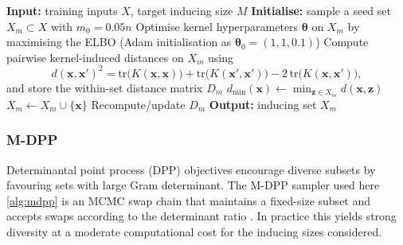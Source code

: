 \documentclass[11pt,a4paper]{article}
\providecommand{\Description}[1]{}
\newcommand{\bx}{\boldsymbol{x}}
\newcommand{\bz}{\boldsymbol{z}}
\newcommand{\btheta}{\boldsymbol{\theta}}
\begin{document}
\begin{algorithm}
\caption{Greedy inducing point selection}
\label{alg:greedy}
\begin{algorithmic}[1]
\State \textbf{Input:} training inputs $X$, target inducing size $M$
\State \textbf{Initialise:} sample a seed set $X_m \subset X$ with $m_0 = 0.05n$
\State Optimise kernel hyperparameters $\btheta$ on $X_m$ by maximising the ELBO (Adam initialisation as $\btheta_0=(1,1,0.1)$)
\State Compute pairwise kernel-induced distances on $X_m$ using
\begin{displaymath}d(\bx,\bx')^2 = \mathrm{tr}\bigl(K(\bx,\bx)\bigr) + \mathrm{tr}\bigl(K(\bx',\bx')\bigr) - 2\,\mathrm{tr}\bigl(K(\bx,\bx')\bigr),\end{displaymath}
and store the within-set distance matrix $D_m$
    \For{$\bx \in X \setminus X_m$}
        \State $d_{\min}(\bx) \gets \min_{\bz\in X_m} d(\bx,\bz)$
        \If{$d_{\min}(\bx) > q_{0.9}(D_m)$}
            \State $X_m \gets X_m \cup \{\bx\}$
            \State Recompute/update $D_m$
        \EndIf
    \EndFor
\EndWhile
\State \textbf{Output:} inducing set $X_m$
\end{algorithmic}
\Description{Pseudocode for greedy inducing-point selection. Starting from a random seed set, the algorithm fits kernel hyperparameters and repeatedly adds training inputs that exceed an adaptive kernel-distance threshold until the target size is reached.}
\end{algorithm}


\subsubsection{M-DPP}
\label{subsubsec:mdpp}
Determinantal point process (DPP) objectives encourage diverse subsets by favouring sets with large Gram determinant. The M-DPP sampler used here \eqref{alg:mdpp} is an MCMC swap chain that maintains a fixed-size subset and accepts swaps according to the determinant ratio \citep{Li2016FastDS}. In practice this yields strong diversity at a moderate computational cost for the inducing sizes considered.
\end{document}
